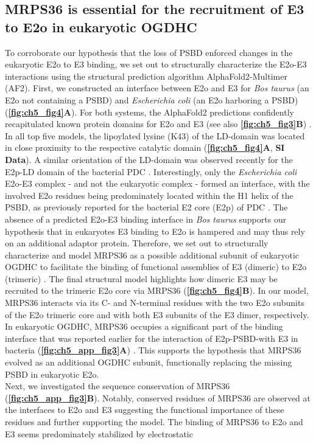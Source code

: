 \subsection*{MRPS36 is essential for the recruitment of E3 to E2o in eukaryotic OGDHC}
To corroborate our hypothesis that the loss of PSBD enforced changes in the eukaryotic E2o to E3 binding, we set out to structurally characterize the E2o-E3 interactions using the structural prediction algorithm AlphaFold2-Multimer \cite{Evans_2022} (AF2). First, we constructed an interface between E2o and E3 for \emph{Bos taurus} (an E2o not containing a PSBD) and \emph{Escherichia coli} (an E2o harboring a PSBD) (\textbf{\autoref{fig:ch5_fig4}A}). For both systems, the AlphaFold2 predictions confidently recapitulated known protein domains for E2o and E3 (see also \textbf{\autoref{fig:ch5_fig3}B}) \cite{Brautigam_2005, Nagy_2021}. In all top five models, the lipoylated lysine (K43) of the LD-domain was located in close proximity to the respective catalytic domain (\textbf{\autoref{fig:ch5_fig4}A}, \textbf{SI Data}). A similar orientation of the LD-domain was observed recently for the E2p-LD domain of the bacterial PDC \cite{Skerlova_2021}. Interestingly, only the \emph{Escherichia coli} E2o-E3 complex - and not the eukaryotic complex - formed an interface, with the involved E2o residues being predominately located within the H1 helix of the PSBD, as previously reported for the bacterial E2 core (E2p) of PDC \cite{Mande_1996}. The absence of a predicted E2o-E3 binding interface in \emph{Bos taurus} supports our hypothesis that in eukaryotes E3 binding to E2o is hampered and may thus rely on an additional adaptor protein. Therefore, we set out to structurally characterize and model MRPS36 as a possible additional subunit of eukaryotic OGDHC to facilitate the binding of functional assemblies of E3 (dimeric) to E2o (trimeric) \cite{Liu_2022, Murphy_2005, Nagy_2021}. The final structural model highlights how dimeric E3 may be recruited to the trimeric E2o core via MRPS36 (\textbf{\autoref{fig:ch5_fig4}B}). In our model, MRPS36 interacts via its C- and N-terminal residues with the two E2o subunits of the E2o trimeric core and with both E3 subunits of the E3 dimer, respectively. In eukaryotic OGDHC, MRPS36 occupies a significant part of the binding interface that was reported earlier for the interaction of E2p-PSBD-with E3 in bacteria (\textbf{\autoref{fig:ch5_app_fig3}A}) \cite{Mande_1996}. This supports the hypothesis that MRPS36 evolved as an additional OGDHC subunit, functionally replacing the missing PSBD in eukaryotic E2o.\\ Next, we investigated the sequence conservation of MRPS36 (\textbf{\autoref{fig:ch5_app_fig3}B}). Notably, conserved residues of MRPS36 are observed at the interfaces to E2o and E3 suggesting the functional importance of these residues and further supporting the model. The binding of MRPS36 to E2o and E3 seems predominately stabilized by electrostatic

